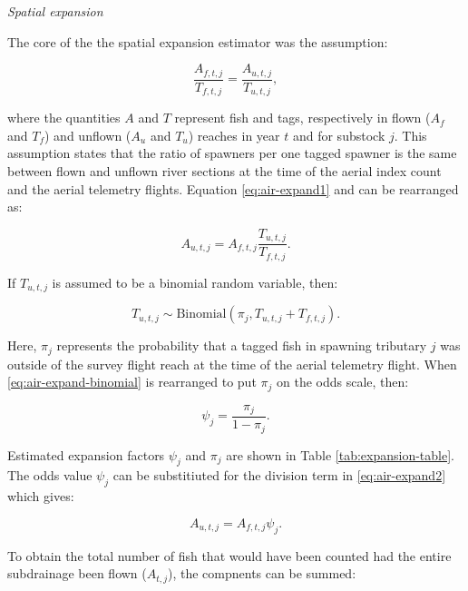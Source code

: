\documentclass[12pt,]{book}
\theoremstyle{definition}
\theoremstyle{definition}
\theoremstyle{definition}
\theoremstyle{remark}
\begin{document}
\noindent
\emph{Spatial expansion}

\noindent
The core of the the spatial expansion estimator was the assumption:

\begin{equation}
  \frac{A_{f,t,j}}{T_{f,t,j}} = \frac{A_{u,t,j}}{T_{u,t,j}},
  \label{eq:air-expand1}
\end{equation}

\noindent
where the quantities \(A\) and \(T\) represent fish and tags,
respectively in flown (\(A_f\) and \(T_f\)) and unflown (\(A_u\) and
\(T_u\)) reaches in year \(t\) and for substock \(j\). This assumption
states that the ratio of spawners per one tagged spawner is the same
between flown and unflown river sections at the time of the aerial index
count and the aerial telemetry flights. Equation \eqref{eq:air-expand1}
and can be rearranged as:

\begin{equation}
  A_{u,t,j} = A_{f,t,j} \frac{T_{u,t,j}}{T_{f,t,j}}.
  \label{eq:air-expand2}
\end{equation}

\noindent
If \(T_{u,t,j}\) is assumed to be a binomial random variable, then:

\begin{equation}
  T_{u,t,j} \sim \text{Binomial}(\pi_j,T_{u,t,j} + T_{f,t,j}).
  \label{eq:air-expand-binomial}
\end{equation}

\noindent
Here, \(\pi_j\) represents the probability that a tagged fish in
spawning tributary \(j\) was outside of the survey flight reach at the
time of the aerial telemetry flight. When \eqref{eq:air-expand-binomial}
is rearranged to put \(\pi_j\) on the odds scale, then:

\begin{equation}
  \psi_j=\frac{\pi_j}{1-\pi_j}.
  \label{eq:air-expand-odds}
\end{equation}

\noindent
Estimated expansion factors \(\psi_j\) and \(\pi_j\) are shown in Table
\ref{tab:expansion-table}. The odds value \(\psi_j\) can be substitiuted
for the division term in \eqref{eq:air-expand2} which gives:

\begin{equation}
  A_{u,t,j} = A_{f,t,j} \psi_j.
  \label{eq:air-expand3}
\end{equation}

\noindent
To obtain the total number of fish that would have been counted had the
entire subdrainage been flown (\(\hat{A}_{t,j}\)), the compnents can be
summed:
\end{document}
